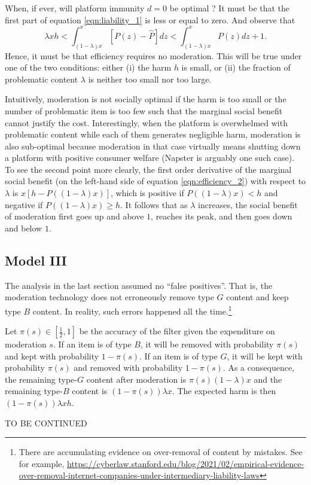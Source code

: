 \documentclass[openbib,12pt]{article}  %
\newcommand{\gs}{\geqslant}
\begin{document}
When, if ever, will platform immunity $d=0$ be optimal ? It must be that the first part of equation \ref{eqn:liability_1} is less or equal to zero. And observe that 
\begin{equation*}
    \lambda xh < \int_{(1-\lambda)x}^x [P(z)-\hat{P}]dz < \int_{(1-\lambda)x}^x P(z)dz + 1.
\end{equation*}
Hence, it must be that efficiency requires no moderation. This will be true under one of the two conditions: either (i) the harm $h$ is small, or (ii) the fraction of problematic content $\lambda$ is neither too small nor too large. 

Intuitively, moderation is not socially optimal if the harm is too small or the number of problematic item is too few such that the marginal social benefit cannot justify the cost. Interestingly, when the platform is overwhelmed with problematic content while each of them generates negligible harm, moderation is also sub-optimal because moderation in that case virtually means shutting down a platform with positive consumer welfare (Napster is arguably one such case). 
To see the second point more clearly, the first order derivative of the marginal social benefit (on the left-hand side of equation \ref{eqn:efficiency_2}) with respect to $\lambda$ is $x[h-P((1-\lambda)x)]$, which is positive if $P((1-\lambda)x)<h$ and negative if $P((1-\lambda)x)\gs h$. It follows that as $\lambda$ increases, the social benefit of moderation first goes up and above $1$, reaches its peak, and then goes down and below $1$. 


\subsection{Model III}
The analysis in the last section assumed no ``false positives''. That is, the moderation technology does not erroneously remove type $G$ content and keep type $B$ content. In reality, such errors happened all the time.\footnote{There are accumulating evidence on over-removal of content by mistakes. See for example, \url{https://cyberlaw.stanford.edu/blog/2021/02/empirical-evidence-over-removal-internet-companies-under-intermediary-liability-laws}}

Let $\pi(s)\in [\frac{1}{2},1]$ be the accuracy of the filter given the expenditure on moderation $s$. If an item is of type $B$, it will be removed with probability $\pi(s)$ and kept with probability $1-\pi(s)$. If an item is of type $G$, it will be kept with probability $\pi(s)$ and removed with probability $1-\pi(s)$. As a consequence, the remaining type-$G$ content after moderation is $\pi(s)(1-\lambda)x$ and the remaining type-$B$ content is $(1-\pi(s))\lambda x$. The expected harm is then $(1-\pi(s))\lambda xh$.


TO BE CONTINUED
\end{document}
